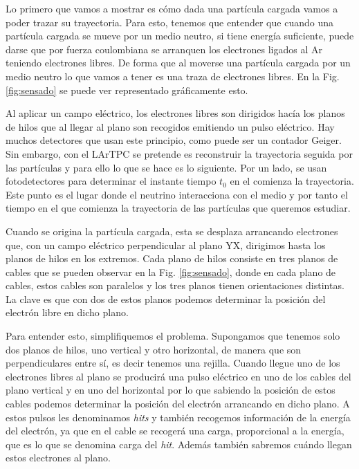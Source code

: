 \documentclass[a4paper,12pt,twoside,titlepage]{article}
\begin{document}
Lo primero que vamos a mostrar es cómo dada una partícula cargada vamos a poder trazar su trayectoria. Para esto, tenemos que entender que cuando una partícula cargada se mueve por un medio neutro, si tiene energía suficiente, puede darse que por fuerza coulombiana se arranquen los electrones ligados al Ar teniendo electrones libres. De forma que al moverse una partícula cargada por un medio neutro lo que vamos a tener es una traza de electrones libres. En la Fig. \ref{fig:sensado} se puede ver representado gráficamente esto.

Al aplicar un campo eléctrico, los electrones libres son dirigidos hacía los planos de hilos que al llegar al plano son recogidos emitiendo un pulso eléctrico. Hay muchos detectores que usan este principio, como puede ser un contador Geiger. Sin embargo, con el LArTPC se pretende es reconstruir la trayectoria seguida por las partículas y para ello lo que se hace es lo siguiente. Por un lado, se usan fotodetectores para determinar el instante tiempo $t_0$ en el comienza la trayectoria. Este punto es el lugar donde el neutrino interacciona con el medio y por tanto el tiempo en el que comienza la trayectoria de las partículas que queremos estudiar. 


Cuando se origina la partícula cargada, esta se desplaza arrancando electrones que, con un campo eléctrico perpendicular al plano YX, dirigimos hasta los planos de hilos en los extremos. Cada plano de hilos consiste en tres planos de cables que se pueden observar en la Fig. \ref{fig:sensado}, donde en cada plano de cables, estos cables son paralelos y los tres planos tienen orientaciones distintas. La clave es que con dos de estos planos podemos determinar la posición  del electrón libre en dicho plano.


Para entender esto, simplifiquemos el problema. Supongamos que tenemos solo dos planos de hilos, uno vertical y otro horizontal, de manera que son perpendiculares entre sí, es decir tenemos una rejilla. Cuando llegue uno de los electrones libres al plano se producirá una pulso eléctrico en uno de los cables del plano vertical y en uno del horizontal por lo que sabiendo la posición de estos cables podemos determinar la posición del electrón arrancando en dicho plano. A estos pulsos les denominamos \textit{hits} y también recogemos información de la energía del electrón, ya que en el cable se recogerá una carga, proporcional a la energía, que es lo que se denomina carga del \textit{hit}. Además también sabremos cuándo llegan estos electrones al plano.
\end{document}
